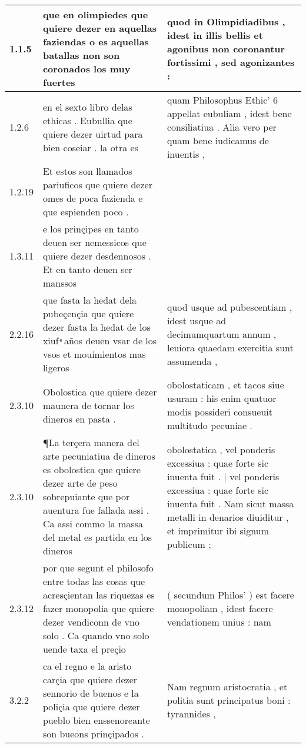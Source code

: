 \begin{tabular}{|p{1cm}|p{6.5cm}|p{6.5cm}|}

\hline
1.1.5 & que en olimpiedes que quiere dezer en aquellas faziendas o es aquellas batallas non son coronados los muy fuertes & quod in Olimpidiadibus , idest in illis bellis et agonibus non coronantur fortissimi , sed agonizantes : \\\hline
1.2.6 & en el sexto libro delas ethicas . Eubullia que quiere dezer uirtud para bien coseiar . la otra es & quam Philosophus Ethic’ 6 appellat eubuliam , idest bene consiliatiua . Alia vero per quam bene iudicamus de inuentis , \\\hline
1.2.19 & Et estos son llamados pariuficos que quiere dezer omes de poca fazienda e que espienden poco . &  \\\hline
1.3.11 & e los prinçipes en tanto deuen ser nemessicos que quiere dezer desdennosos . Et en tanto deuen ser manssos &  \\\hline
2.2.16 & que fasta la hedat dela pubeçençia que quiere dezer fasta la hedat de los xiuf ͤ años deuen vsar de los vsos et mouimientos mas ligeros & quod usque ad pubescentiam , idest usque ad decimumquartum annum , leuiora quaedam exercitia sunt assumenda , \\\hline
2.3.10 & Obolostica que quiere dezer maunera de tornar los dineros en pasta . & obolostaticam , et tacos siue usuram : his enim quatuor modis possideri consueuit multitudo pecuniae . \\\hline
2.3.10 & ¶La terçera manera del arte pecuniatiua de dineros es obolostica que quiere dezer arte de peso sobrepuiante que por auentura fue fallada assi . Ca assi commo la massa del metal es partida en los dineros & obolostatica , vel ponderis excessiua : quae forte sic inuenta fuit . | vel ponderis excessiua : quae forte sic inuenta fuit . Nam sicut massa metalli in denarios diuiditur , et imprimitur ibi signum publicum ; \\\hline
2.3.12 & por que segunt el philosofo entre todas las cosas que acresçientan las riquezas es fazer monopolia que quiere dezer vendiconn de vno solo . Ca quando vno solo uende taxa el preçio & ( secundum Philos’ ) est facere monopoliam , idest facere vendationem unius : nam \\\hline
3.2.2 & ca el regno e la aristo carçia que quiere dezer sennorio de buenos e la poliçia que quiere dezer pueblo bien enssenoreante son bueons prinçipados . & Nam regnum aristocratia , et politia sunt principatus boni : tyrannides , \\\hline

\end{tabular}
